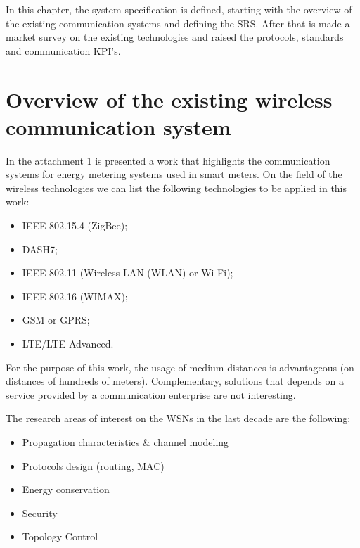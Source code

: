 
In this chapter, the system specification is defined, starting with the overview of the existing communication systems and defining the SRS. After that is made a market survey on the existing technologies and raised the protocols, standards and communication KPI's.

\vspace{2em}

\section{Overview of the existing wireless communication system}
In the attachment 1 is presented a work that highlights the communication systems for energy metering systems used in smart meters. On the field of the wireless technologies we can list the following technologies to be applied in this work:

\begin{itemize}
	\setlength\itemsep{-0.5em}
	\item IEEE 802.15.4 (ZigBee);
	\item DASH7;
	\item IEEE 802.11 (Wireless LAN (WLAN) or Wi-Fi);
	\item IEEE 802.16 (WIMAX);
	\item GSM or GPRS;
	\item LTE/LTE-Advanced.	
\end{itemize}

For the purpose of this work, the usage of medium distances is advantageous (on distances of hundreds of meters). Complementary, solutions that depends on a service provided by a communication enterprise are not interesting. 


The research areas of interest on the WSNs in the last decade are the following:

\begin{itemize}
	\setlength\itemsep{-0.5em}
	\item Propagation characteristics \& channel modeling
	\item Protocols design (routing, MAC)
	\item Energy conservation
	\item Security
	\item Topology Control

\end{itemize}

